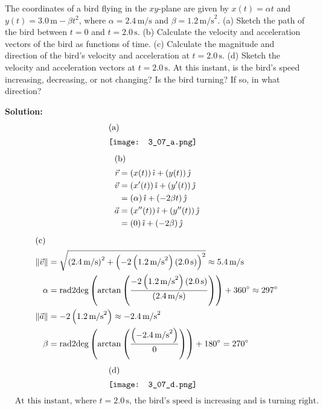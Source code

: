 \documentclass[12pt]{article}
\newenvironment{problem}[2][]{
    \begin{trivlist}
        \item[
            {\bfseries #1}
            {\bfseries #2}
        ]
}{\end{trivlist}}
\newcommand{\solution}{\medskip\noindent\textbf{Solution:}}
\newcommand{\Part}[1]{\shortintertext{(#1)}}
\newcommand{\magnitude}[1]{\lVert #1 \rVert}
\newcommand{\UVector}[2]{\left(#1\right)\ihat + \left(#2\right)\jhat}
\newcommand{\ihat}{\hat{\imath}}
\newcommand{\jhat}{\hat{\jmath}}
\newcommand{\radtodeg}[1]{\mbox{rad2deg}\left(#1\right)}
\newcommand{\unit}[1]{\, \text{#1}}
\newcommand{\m}{\unit{m}}
\newcommand{\mps}{\unit{m/s}}
\newcommand{\s}{\unit{s}}
\begin{document}
\begin{problem}{3.7}
    The coordinates of a bird flying in the $xy$-plane are given by $x(t) = \alpha t$ and $y(t) = 3.0 \m - \beta t^2$, where $\alpha = 2.4 \mps$ and $\beta = 1.2 \mps^2$.
    (a) Sketch the path of the bird between $t = 0$ and $t = 2.0 \s$.
    (b) Calculate the velocity and acceleration vectors of the bird as functions of time.
    (c) Calculate the magnitude and direction of the bird's velocity and acceleration at $t = 2.0 \s$.
    (d) Sketch the velocity and acceleration vectors at $t = 2.0 \s$. At this instant, is the bird's speed increasing, decreasing, or not changing?
    Is the bird turning?
    If so, in what direction?

    \solution
    \begin{align*}
        \Part{a}
        &\texttt{[image: 3\_07\_a.png]}
    \end{align*}
    \begin{align}
        \Part{b}
        \vec{r} &= \UVector{x(t)}{y(t)} \\
        \vec{v} &= \UVector{x'(t)}{y'(t)} \\
        &= \UVector{\alpha}{-2 \beta t} \\
        \vec{a} &= \UVector{x''(t)}{y''(t)} \\
        &= \UVector{0}{-2 \beta}
    \end{align}
    \begin{align}
        \Part{c}
        \magnitude{\vec{v}} &= \sqrt{\left(2.4 \mps\right)^2 + \left(-2 \left(1.2 \mps^2\right) \left(2.0 \s\right)\right)^2} \approx 5.4 \mps \\
        \alpha &= \radtodeg{\arctan{\left(\frac{-2 \left(1.2 \mps^2\right) \left(2.0 \s\right)}{\left(2.4 \mps\right)}\right)}} + 360^\circ \approx 297^\circ \\
        \magnitude{\vec{a}} &= -2 \left(1.2 \mps^2\right) \approx -2.4 \mps^2 \\
        \beta &= \radtodeg{\arctan\left(\frac{\left(-2.4 \mps^2\right)}{0}\right)} + 180^\circ = 270^\circ
    \end{align}
    \begin{align*}
        \Part{d}
        &\texttt{[image: 3\_07\_d.png]} 
    \end{align*}
    \begin{align}
        &\text{At this instant, where $t = 2.0 \s$, the bird's speed is increasing and is turning right.} 
    \end{align}
\end{problem}
\end{document}
